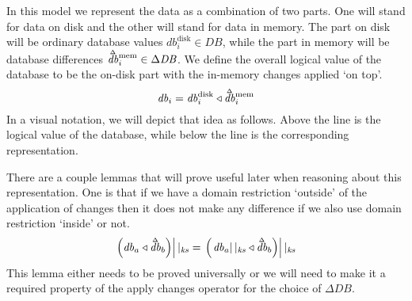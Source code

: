 \documentclass[11pt,a4paper]{article}
\newcommand\restrict[2]{\left.#1\right||_{#2}}
\newcommand\deltavar[1]{\accentset{\Delta}{#1}}
\begin{document}
In this model we represent the data as a combination of two parts. One will
stand for data on disk and the other will stand for data in memory. The part on
disk will be ordinary database values
$\mathit{db}^{\mathrm{disk}}_i \in \mathit{DB}$, while the part in memory will
be database differences
$\deltavar{\mathit{db}}^{\mathrm{mem}}_i \in \Delta{\mathit{DB}}$. We
define the  overall logical value of the database to be the on-disk part with
the in-memory changes applied `on top'.
\begin{equation}
\label{eq:hybrid-db}
\mathit{db}_i = \mathit{db}^{\mathrm{disk}}_i \triangleleft \deltavar{\mathit{db}}^{\mathrm{mem}}_i
\end{equation}
In a visual notation, we will depict that idea as follows. Above the line is
the logical value of the database, while below the line is the corresponding
representation.
\begin{center}
\end{center}

There are a couple lemmas that will prove useful later when reasoning about
this representation. One is that if we have a domain restriction `outside' of
the application of changes then it does not make any difference if we also use
domain restriction `inside' or not.
\begin{equation}
\label{eq:restriction}
  \restrict{\left(\mathit{db}_a \triangleleft \deltavar{\mathit{db}}_b\right)}{\mathit{ks}}
=
  \restrict{\left(\restrict{\mathit{db}_a}{\mathit{ks}} \triangleleft \deltavar{\mathit{db}}_b\right)}{\mathit{ks}}
\end{equation}
This lemma either needs to be proved universally or we will need to make it a
required property of the apply changes operator for the choice of $\Delta\mathit{DB}$.
\end{document}

